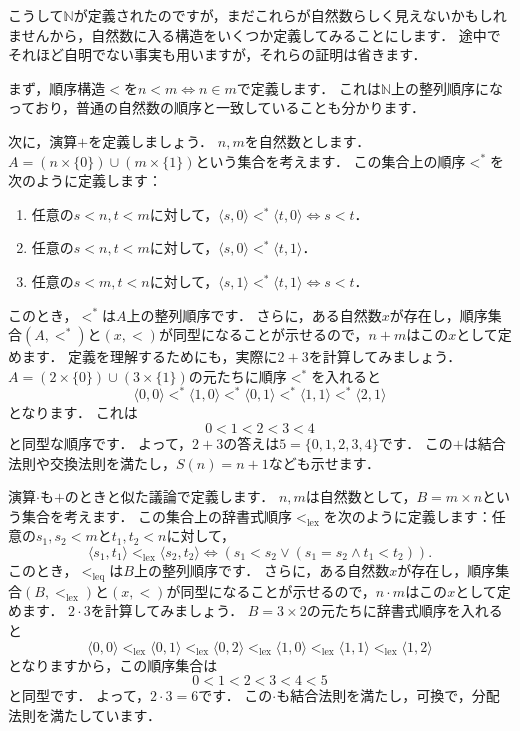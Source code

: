 \documentclass[./main]{subfiles}
\newcommand{\mbb}{\mathbb}
\begin{document}
こうして$\mbb{N}$が定義されたのですが，まだこれらが自然数らしく見えないかもしれませんから，自然数に入る構造をいくつか定義してみることにします．
途中でそれほど自明でない事実も用いますが，それらの証明は省きます．

まず，順序構造$<$を$n<m\iff n\in m$で定義します．
これは$\mbb{N}$上の整列順序になっており，普通の自然数の順序と一致していることも分かります．

次に，演算$+$を定義しましょう．
$n, m$を自然数とします．
$A=(n\times\{0\})\cup(m\times\{1\})$という集合を考えます．
この集合上の順序$<^{*}$を次のように定義します：
\begin{enumerate}
\item 任意の$s<n, t<m$に対して，$\langle s, 0\rangle <^{*}\langle t, 0\rangle\iff s<t$．
\item 任意の$s<n, t<m$に対して，$\langle s, 0\rangle <^{*} \langle t, 1\rangle$．
\item 任意の$s<m, t<n$に対して，$\langle s, 1\rangle <^{*}\langle t, 1\rangle\iff s<t$．
\end{enumerate}
このとき，$<^{*}$は$A$上の整列順序です．
さらに，ある自然数$x$が存在し，順序集合$(A, <^{*})$と$(x, <)$が同型になることが示せるので，$n+m$はこの$x$として定めます．
定義を理解するためにも，実際に$2+3$を計算してみましょう．
$A=(2\times\{0\})\cup(3\times\{1\})$の元たちに順序$<^{*}$を入れると
\[
\langle 0, 0\rangle <^{*} \langle 1, 0\rangle <^{*} \langle 0, 1\rangle <^{*} \langle 1, 1 \rangle <^{*} \langle 2, 1 \rangle
\]
となります．
これは
\[
0 < 1 < 2 < 3 < 4
\]
と同型な順序です．
よって，$2+3$の答えは$5=\{0, 1, 2, 3, 4\}$です．
この$+$は結合法則や交換法則を満たし，$S(n)=n+1$なども示せます．

演算$\cdot$も$+$のときと似た議論で定義します．
$n, m$は自然数として，$B=m\times n$という集合を考えます．
この集合上の辞書式順序$<_{\text{lex}}$を次のように定義します：任意の$s_1, s_2 < m$と$t_1, t_2 < n$に対して，
\[
\langle s_1, t_1\rangle <_{\text{lex}}\langle s_2, t_2\rangle\iff (s_1 < s_2 \lor (s_1 = s_2 \land t_1 < t_2)).
\]
このとき，$<_{\text{leq}}$は$B$上の整列順序です．
さらに，ある自然数$x$が存在し，順序集合$(B, <_{\text{lex}})$と$(x, <)$が同型になることが示せるので，$n\cdot m$はこの$x$として定めます．
$2\cdot 3$を計算してみましょう．
$B=3\times 2$の元たちに辞書式順序を入れると
\[
\langle 0, 0\rangle <_{\text{lex}} \langle 0, 1\rangle <_{\text{lex}} \langle 0, 2\rangle <_{\text{lex}} \langle 1, 0 \rangle <_{\text{lex}} \langle 1, 1\rangle <_{\text{lex}} \langle 1, 2\rangle
\]
となりますから，この順序集合は
\[
0<1<2<3<4<5
\]
と同型です．
よって，$2\cdot 3 = 6$です．
この$\cdot$も結合法則を満たし，可換で，分配法則を満たしています．
\end{document}
